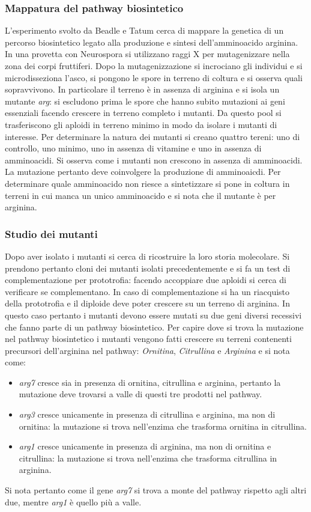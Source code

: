 \subsubsection{Mappatura del pathway biosintetico}
L'esperimento svolto da Beadle e Tatum cerca di mappare la genetica di un percorso biosintetico legato alla produzione e sintesi dell'amminoacido arginina. In una provetta con Neurospora si 
utilizzano raggi X per mutagenizzare nella zona dei corpi fruttiferi. Dopo la mutagenizzazione si incrociano gli individui e si microdisseziona l'asco, si pongono le spore in terreno di coltura e si
osserva quali sopravvivono. In particolare il terreno \`e in assenza di arginina e si isola un mutante \emph{arg}: si escludono prima le spore che hanno subito mutazioni ai geni essenziali facendo 
crescere in terreno completo i mutanti. Da questo pool si trasferiscono gli aploidi in terreno minimo in modo da isolare i mutanti di interesse. Per determinare la natura dei mutanti si creano quattro
tereni: uno di controllo, uno minimo, uno in assenza di vitamine e uno in assenza di amminoacidi. Si osserva come i mutanti non crescono in assenza di amminoacidi. La mutazione pertanto deve coinvolgere
la produzione di amminoaicdi. Per determinare quale amminoacido non riesce a sintetizzare si pone in coltura in terreni in cui manca un unico amminoacido e si nota che il mutante \`e per arginina. 
\subsubsection{Studio dei mutanti}
Dopo aver isolato i mutanti si cerca di ricostruire la loro storia molecolare. Si prendono pertanto cloni dei mutanti isolati precedentemente e si fa un test di complementazione per prototrofia: 
facendo accoppiare due aploidi si cerca di verificare se complementano. In caso di complementazione si ha un riacquisto della prototrofia e il diploide deve poter crescere su un terreno di arginina. In
questo caso pertanto i mutanti devono essere mutati su due geni diversi recessivi che fanno parte di un pathway biosintetico. Per capire dove si trova la mutazione nel pathway biosintetico i mutanti 
vengono fatti crescere su terreni contenenti precursori dell'arginina nel pathway: \emph{Ornitina}, \emph{Citrullina} e \emph{Arginina} e si nota come: 
\begin{itemize}
	\item \emph{arg7} cresce sia in presenza di ornitina, citrullina e arginina, pertanto la mutazione deve trovarsi a valle di questi tre prodotti nel pathway.
	\item \emph{arg3} cresce unicamente in presenza di citrullina e arginina, ma non di ornitina: la mutazione si trova nell'enzima che trasforma ornitina in citrullina.
	\item \emph{arg1} cresce unicamente in presenza di arginina, ma non di ornitina e citrullina: la mutazione si trova nell'enzima che  trasforma citrullina in arginina.
\end{itemize}
Si nota pertanto come il gene \emph{arg7} si trova a monte del pathway rispetto agli altri due, mentre \emph{arg1} \`e quello pi\`u a valle.

